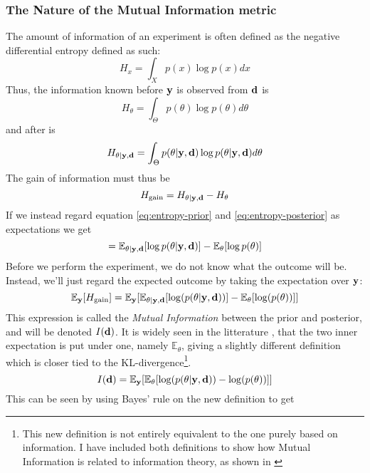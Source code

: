 \subsubsection{The Nature of the Mutual Information metric}
The amount of information of an experiment is often defined as the negative differential entropy defined as such\cite{lindley56}:
\begin{equation}H_x = \int_{X}p(x)\log p(x)dx\end{equation}
Thus, the information known before $\mathbf{y}$ is observed from $\mathbf{d}$ is
\begin{equation}\label{eq:entropy-prior}H_\theta = \int_{\Theta}p(\theta)\log p(\theta)d\theta\end{equation}
and after is
\begin{equation}\label{eq:entropy-posterior}H_{\theta | \mathbf{y}, \mathbf{d}} = \int_{\Theta}p(\theta| \mathbf{y}, \mathbf{d})\log p(\theta| \mathbf{y}, \mathbf{d})d\theta\end{equation}
The gain of information must thus be
\begin{equation}H_\textrm{gain} = H_{\theta | \mathbf{y}, \mathbf{d}} - H_\theta\end{equation}
If we instead regard equation \ref{eq:entropy-prior} and \ref{eq:entropy-posterior} as expectations we get
\begin{equation} = \mathbb{E}_{\theta | \mathbf{y}, \mathbf{d}}[\log p(\theta | \mathbf{y}, \mathbf{d})] - \mathbb{E}_\theta [\log p(\theta )]\end{equation}
Before we perform the experiment, we do not know what the outcome will be. Instead, we'll just regard the expected outcome by taking the expectation over $\mathbf{y}$:
\begin{equation} \label{eq:mi-bad}\mathbb{E}_{\mathbf{y}}[H_\textrm{gain}]  = \mathbb{E}_{\mathbf{y}}[\mathbb{E}_{\theta | \mathbf{y}, \mathbf{d}} [\log(p(\theta | \mathbf{y}, \mathbf{d}))] - \mathbb{E}_{\theta}[\log(p(\theta))]]\end{equation}
This expression is called the \textit{Mutual Information} between the prior and posterior, and will be denoted $I(\mathbf{d})$.
It is widely seen in the litterature \cite{lindley56}, \cite{ryan15} that the two inner expectation is put under one, namely $\mathbb{E}_{\theta}$, giving a slightly different definition which is closer tied to the KL-divergence\footnote{This new definition is not entirely equivalent to the one purely based on information. I have included both definitions to show how Mutual Information is related to information theory, as shown in \citet{lindley56}}.
\begin{equation} \label{eq:mi}I(\mathbf{d})  = \mathbb{E}_{\mathbf{y}}[\mathbb{E}_{\theta} [\log(p(\theta | \mathbf{y}, \mathbf{d})) - \log(p(\theta))]]\end{equation}
This can be seen by using Bayes' rule on the new definition to get

